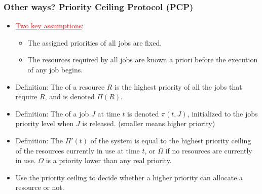 \documentclass[t]{beamer}
\begin{document}
\begin{frame}
  \frametitle{Other ways? Priority Ceiling Protocol (PCP)}

  \begin{itemize}
  \item \underline{\textcolor{red}{Two key assumptions}}:
    \begin{itemize}
    \item The assigned priorities of all jobs are fixed.
    \item The resources required by all jobs are known a priori before
      the execution of any job begins.
    \end{itemize}
  \item Definition: The  of a resource $R$ is the 
    highest priority of all the jobs that require $R$, and is denoted 
    $\Pi(R)$. 
  \item Definition: The  of a job $J$ at
    time $t$ is denoted 
    $\pi(t, J)$, initialized to the jobs priority level when $J$ is
    released. (smaller means higher priority) 
  \item Definition: The  $\Pi'(t)$ of the
    system is equal to the highest priority ceiling of the resources
    currently in use at time $t$, or $\Omega$ if no resources are
    currently in use. $\Omega$ is a priority lower than any real
    priority.
  \item Use the priority ceiling to decide whether a higher priority
    can allocate a resource or not.
  \end{itemize}  
\end{frame}
\end{document}
